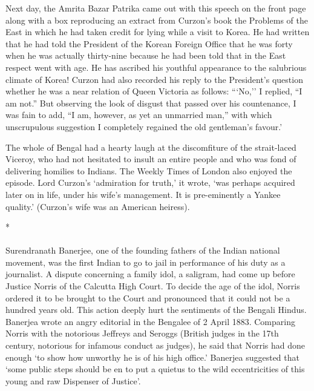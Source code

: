 Next day, the Amrita Bazar Patrika came out with this speech on the front page along with a box reproducing an extract from Curzon's book the Problems of the East in which he had taken credit for lying while a visit to Korea. He had written that he had told the President of the Korean Foreign Office that he was forty when he was actually thirty-nine because he had been told that in the East respect went with age. He has ascribed his youthful appearance to the salubrious climate of Korea! Curzon had also recorded his reply to the President's question whether he was a near relation of Queen Victoria as follows: ```No,'' I replied, ``I am not.'' But observing the look of disgust that passed over his countenance, I was fain to add, ``I am, however, as yet an unmarried man,'' with which unscrupulous suggestion I completely regained the old gentleman's favour.'

The whole of Bengal had a hearty laugh at the discomfiture of the strait-laced Viceroy, who had not hesitated to insult an entire people and who was fond of delivering homilies to Indians. The Weekly Times of London also enjoyed the episode. Lord Curzon's `admiration for truth,' it wrote, `was perhaps acquired later on in life, under his wife's management. It is pre-eminently a Yankee quality.' (Curzon's wife was an American heiress).

\begin{center}*\end{center}

\paragraph*{}

Surendranath Banerjee, one of the founding fathers of the Indian national movement, was the first Indian to go to jail in performance of his duty as a journalist. A dispute concerning a family idol, a saligram, had come up before Justice Norris of the Calcutta High Court. To decide the age of the idol, Norris ordered it to be brought to the Court and pronounced that it could not be a hundred years old. This action deeply hurt the sentiments of the Bengali Hindus. Banerjea wrote an angry editorial in the Bengalee of 2 April 1883. Comparing Norris with the notorious Jeffreys and Seroggs (British judges in the 17th century, notorious for infamous conduct as judges), he said that Norris had done enough `to show how unworthy he is of his high office.' Banerjea suggested that `some public steps should be en to put a quietus to the wild eccentricities of this young and raw Dispenser of Justice'.


